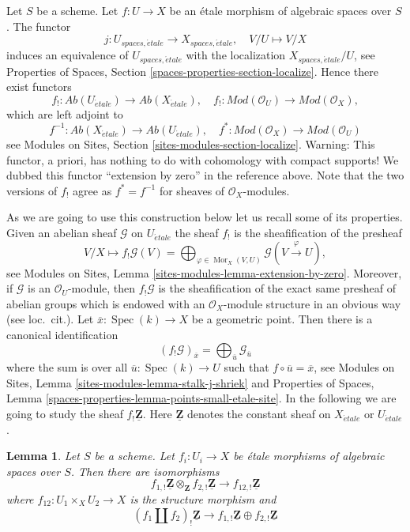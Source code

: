 \documentclass{stacks-project}
\theoremstyle{plain}
\newtheorem{lemma}[subsection]{Lemma}
\theoremstyle{definition}
\theoremstyle{remark}
\numberwithin{equation}{subsection}
\def\Spec{\mathop{\mathrm{Spec}}}
\def\Mor{\mathop{\mathrm{Mor}}\nolimits}
\def\etale{{\acute{e}tale}}
\begin{document}
\noindent
Let $S$ be a scheme. Let $f : U \to X$ be an \'etale morphism of algebraic
spaces over $S$. The functor
$$
j : U_{spaces, \etale} \longrightarrow X_{spaces, \etale},\quad
V/U \longmapsto V/X
$$
induces an equivalence of $U_{spaces, \etale}$ with the localization
$X_{spaces, \etale}/U$, see
Properties of Spaces, Section \ref{spaces-properties-section-localize}.
Hence there exist functors
$$
f_! : \textit{Ab}(U_\etale) \longrightarrow
\textit{Ab}(X_\etale),\quad
f_! : \textit{Mod}(\mathcal{O}_U) \longrightarrow \textit{Mod}(\mathcal{O}_X),
$$
which are left adjoint to
$$
f^{-1} : \textit{Ab}(X_\etale) \longrightarrow
\textit{Ab}(U_\etale),\quad
f^* : \textit{Mod}(\mathcal{O}_X) \longrightarrow \textit{Mod}(\mathcal{O}_U)
$$
see
Modules on Sites, Section \ref{sites-modules-section-localize}.
Warning: This functor, a priori, has
nothing to do with cohomology with compact supports!
We dubbed this functor ``extension by zero'' in the reference above.
Note that the two versions of $f_!$ agree as $f^* = f^{-1}$ for
sheaves of $\mathcal{O}_X$-modules.

\medskip\noindent
As we are going to use this construction below let us recall some of its
properties. Given an abelian sheaf $\mathcal{G}$ on $U_\etale$
the sheaf $f_!$ is the sheafification of the presheaf
$$
V/X \longmapsto
f_!\mathcal{G}(V) =
\bigoplus\nolimits_{\varphi \in \Mor_X(V, U)}
\mathcal{G}(V \xrightarrow{\varphi} U),
$$
see
Modules on Sites, Lemma \ref{sites-modules-lemma-extension-by-zero}.
Moreover, if $\mathcal{G}$ is an $\mathcal{O}_U$-module, then $f_!\mathcal{G}$
is the sheafification of the exact same presheaf of abelian groups which
is endowed with an $\mathcal{O}_X$-module structure in an obvious way
(see loc.\ cit.). Let $\overline{x} : \Spec(k) \to X$
be a geometric point. Then there is a canonical identification
$$
(f_!\mathcal{G})_{\overline{x}} =
\bigoplus\nolimits_{\overline{u}} \mathcal{G}_{\overline{u}}
$$
where the sum is over all $\overline{u} : \Spec(k) \to U$ such that
$f \circ \overline{u} = \overline{x}$, see
Modules on Sites, Lemma \ref{sites-modules-lemma-stalk-j-shriek}
and
Properties of Spaces, Lemma
\ref{spaces-properties-lemma-points-small-etale-site}.
In the following we are going to study the sheaf $f_!\underline{\mathbf{Z}}$.
Here $\underline{\mathbf{Z}}$ denotes the constant sheaf on
$X_\etale$ or $U_\etale$.

\begin{lemma}
\label{lemma-product-is-tensor-product}
Let $S$ be a scheme. Let $f_i : U_i \to X$ be \'etale morphisms
of algebraic spaces over $S$. Then there are isomorphisms
$$
f_{1, !}\underline{\mathbf{Z}} \otimes_{\mathbf{Z}}
f_{2, !}\underline{\mathbf{Z}}
\longrightarrow
f_{12, !}\underline{\mathbf{Z}}
$$
where $f_{12} : U_1 \times_X U_2 \to X$ is the structure morphism
and
$$
(f_1 \amalg f_2)_! \underline{\mathbf{Z}}
\longrightarrow
f_{1, !}\underline{\mathbf{Z}} \oplus
f_{2, !}\underline{\mathbf{Z}}
$$
\end{lemma}
\end{document}
